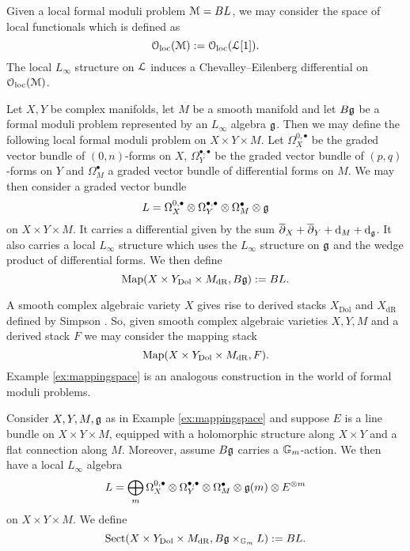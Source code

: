 \documentclass[10pt, oneside]{article}
\begin{document}
Given a local formal moduli problem $\mathcal M=B L$, we may consider the space of local functionals which is defined as
\[\mathcal{O}_{\rm loc}(\mathcal M) := \mathcal{O}_{\rm loc}(\mathcal L[1]).\]
The local $L_\infty$ structure on $\mathcal L$ induces a Chevalley--Eilenberg differential on $\mathcal{O}_{\rm loc}(\mathcal M)$.

\begin{example}
Let $X,Y$ be complex manifolds, let $M$ be a smooth manifold and let $B\mathfrak g$ be a formal moduli problem represented by an $L_\infty$ algebra $\mathfrak g$. Then we may define the following local formal moduli problem on $X\times Y\times M$. Let $\Omega^{0, \bullet}_X$ be the graded vector bundle of $(0, n)$-forms on $X$, $\Omega^{\bullet, \bullet}_Y$ be the graded vector bundle of $(p, q)$-forms on $Y$ and $\Omega^\bullet_M$ a graded vector bundle of differential forms on $M$. We may then consider a graded vector bundle
\[L = \Omega^{0,\bullet}_X\otimes \Omega^{\bullet, \bullet}_Y\otimes \Omega^\bullet_M\otimes \mathfrak g\]
on $X\times Y\times M$. It carries a differential given by the sum $\overline{\partial}_X + \overline{\partial}_Y + {\rm d}_M + {\rm d}_\mathfrak g$. It also carries a local $L_\infty$ structure which uses the $L_\infty$ structure on $\mathfrak g$ and the wedge product of differential forms. We then define
\[\operatorname{Map}(X\times Y_{\mathrm{Dol}}\times M_{\mathrm{dR}}, B\mathfrak g) := B L.\]
\label{ex:mappingspace}
\end{example}

\begin{remark}
A smooth complex algebraic variety $X$ gives rise to derived stacks $X_{\mathrm{Dol}}$ and $X_{\mathrm{dR}}$ defined by Simpson \cite{Simpson,PTVV}. So, given smooth complex algebraic varieties $X,Y,M$ and a derived stack $F$ we may consider the mapping stack
\[\operatorname{Map}(X\times Y_{\mathrm{Dol}}\times M_{\mathrm{dR}}, F).\]
Example \ref{ex:mappingspace} is an analogous construction in the world of formal moduli problems.
\end{remark}

\begin{example}
Consider $X, Y, M, \mathfrak g$ as in Example \ref{ex:mappingspace} and suppose $E$ is a line bundle on $X\times Y\times M$, equipped with a holomorphic structure along $X\times Y$ and a flat connection along $M$. Moreover, assume $B\mathfrak g$ carries a $\mathbb{G}_m$-action. We then have a local $L_\infty$ algebra
\[L = \bigoplus_m \Omega^{0,\bullet}_X\otimes \Omega^{\bullet, \bullet}_Y\otimes \Omega^\bullet_M\otimes \mathfrak g(m)\otimes E^{\otimes m}\]
on $X\times Y\times M$. We define
\[\mathrm{Sect}(X\times Y_{\mathrm{Dol}}\times M_{\mathrm{dR}}, B\mathfrak g\times_{\mathbb{G}_m} L) := B L.\]
\end{example}
\end{document}
